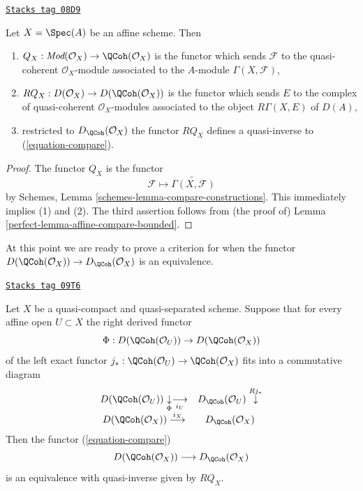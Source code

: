 \begin{lemma}
\label{perfect-lemma-affine-coherator}
\href{https://stacks.math.columbia.edu/tag/08D9}{\texttt{Stacks tag 08D9}}

Let $X = \Spec(A)$ be an affine scheme. Then
\begin{enumerate}
\item $Q_X : \textit{Mod}(\mathcal{O}_X) \to \QCoh(\mathcal{O}_X)$
is the functor
which sends $\mathcal{F}$ to the quasi-coherent $\mathcal{O}_X$-module
associated to the $A$-module $\Gamma(X, \mathcal{F})$,
\item $RQ_X : D(\mathcal{O}_X) \to D(\QCoh(\mathcal{O}_X))$
is the functor which sends $E$ to the complex of quasi-coherent
$\mathcal{O}_X$-modules associated to the object $R\Gamma(X, E)$ of $D(A)$,
\item restricted to $D_\QCoh(\mathcal{O}_X)$ the functor
$RQ_X$ defines a quasi-inverse to (\ref{equation-compare}).
\end{enumerate}
\end{lemma}

\begin{proof}

The functor $Q_X$ is the functor
$$
\mathcal{F} \mapsto \widetilde{\Gamma(X, \mathcal{F})}
$$
by Schemes, Lemma \ref{schemes-lemma-compare-constructions}.
This immediately implies (1) and (2). The third assertion
follows from (the proof of)
Lemma \ref{perfect-lemma-affine-compare-bounded}.
\end{proof}

At this point we are ready to prove a criterion
for when the functor $D(\QCoh(\mathcal{O}_X)) \to D_\QCoh(\mathcal{O}_X)$
is an equivalence.

\begin{lemma}
\label{perfect-lemma-argument-proves}
\href{https://stacks.math.columbia.edu/tag/09T6}{\texttt{Stacks tag 09T6}}

Let $X$ be a quasi-compact and quasi-separated scheme. Suppose that
for every affine open $U \subset X$ the right derived functor
$$
\Phi : D(\QCoh(\mathcal{O}_U)) \to D(\QCoh(\mathcal{O}_X))
$$
of the left exact functor
$j_* : \QCoh(\mathcal{O}_U) \to \QCoh(\mathcal{O}_X)$
fits into a commutative diagram
$$
\begin{array}{cc}D(\QCoh(\mathcal{O}_U)) \underset{\Phi}{\downarrow}\underset{i_U}{\longrightarrow} & D_\QCoh(\mathcal{O}_U) \overset{Rj_*}{\downarrow} \\ D(\QCoh(\mathcal{O}_X)) \overset{i_X}{\longrightarrow} & D_\QCoh(\mathcal{O}_X)\end{array}
$$
Then the functor (\ref{equation-compare})
$$
D(\QCoh(\mathcal{O}_X))
\longrightarrow
D_\QCoh(\mathcal{O}_X)
$$
is an equivalence with quasi-inverse given by $RQ_X$.
\end{lemma}

